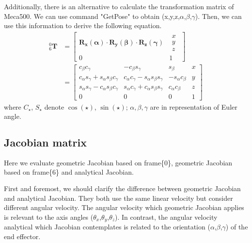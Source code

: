 Additionally, there is an alternative to calculate the transformation matrix of Meca500. We can use command "GetPose" to obtain (x,y,z,$\alpha$,$\beta$,$\gamma$). Then, we can use this information to derive the following equation.
\begin{equation}
\begin{split}
^0_6\mathbf{T} 
&= 
\begin{bmatrix}
\mathbf{R_x(\alpha ) \cdot R_y(\beta ) \cdot R_z(\gamma )} 
& \begin{matrix}
x\\ 
y\\ 
z
\end{matrix}\\ 
0 & 1
\end{bmatrix}\\
&= 
\begin{bmatrix} 
c_\beta c_\gamma 										& -c_\beta s_\gamma 									& s_\beta 					&x\\ 
c_\alpha s_\gamma +  s_\alpha s_\beta c_\gamma 			& c_\alpha c_\gamma -  s_\alpha s_\beta s_\gamma		& -s_\alpha c_\beta			&y\\ 
s_\alpha s_\gamma -  c_\alpha s_\beta c_\gamma 			& s_\alpha c_\gamma +  c_\alpha s_\beta s_\gamma 		& c_\alpha c_\beta 			&z\\ 
0 														&0 														&0							&1
\end{bmatrix}
\end{split}
\end{equation}
where $C_{\star} $, $ S_{\star}$ denote $\cos \left(\star \right)$, $\sin \left(\star \right)$; $\alpha ,\beta ,\gamma$ are in representation of Euler angle.
\subsection{Jacobian matrix} 
\label{sec:jacobian}
Here we evaluate geometric Jacobian based on frame\{0\}, geometric Jacobian based on frame\{6\} and analytical Jacobian.

First and foremost, we should clarify the difference between geometric Jacobian and analytical Jacobian. They both use the same linear velocity but consider different angular velocity. The angular velocity which geometric Jacobian applies is relevant to the axis angles ($\theta _x$,$\theta _y$,$\theta _z$). In contrast, the angular velocity analytical which Jacobian contemplates is related to the orientation ($\alpha$,$\beta$,$\gamma$) of the end effector.
